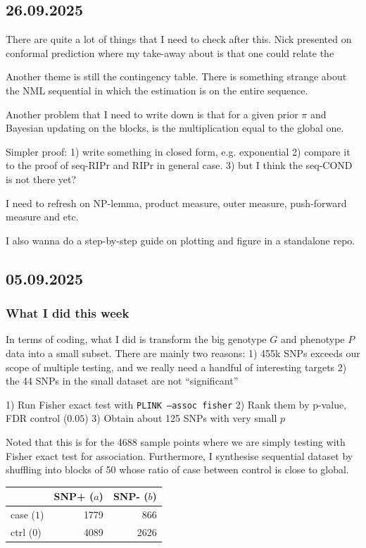 \subsection*{26.09.2025}

There are quite a lot of things that I need to check after this.
Nick presented on conformal prediction where my take-away about is that
one could relate the

Another theme is still the contingency table.
There is something strange about the NML sequential
in which the estimation is on the entire sequence.

Another problem that I need to write down is that for a given prior $\pi$
and Bayesian updating on the blocks, is the multiplication equal to the
global one.

Simpler proof:
1) write something in closed form, e.g. exponential
2) compare it to the proof of seq-RIPr and RIPr in general case.
3) but I think the seq-COND is not there yet?

I need to refresh on NP-lemma, product measure, outer measure, push-forward measure
and etc.

I also wanna do a step-by-step guide on plotting and figure in a standalone repo.

\subsection*{05.09.2025}

\subsubsection*{What I did this week}

In terms of coding, what I did is transform the big genotype $G$ and phenotype $P$ data
into a small subset. There are mainly two reasons:
1) 455k SNPs exceeds our scope of multiple testing, and we really need a handful
of interesting targets
2) the 44 SNPs in the small dataset are not ``significant''

1) Run Fisher exact test with \texttt{PLINK --assoc fisher}
2) Rank them by p-value, FDR control ($0.05$)
3) Obtain about 125 SNPs with very small $p$

Noted that this is for the 4688 sample points where we are simply testing
with Fisher exact test for association.
Furthermore, I synthesise sequential dataset by shuffling into blocks
of 50 whose ratio of case between control is close to global.

\begin{table}[h]
	\centering
	\begin{tabular}{lrr}
		\toprule
		           & SNP+ ($a$) & SNP- ($b$) \\
		\midrule
		case ($1$) & 1779       & 866        \\
		ctrl ($0$) & 4089       & 2626       \\
		\bottomrule
	\end{tabular}
\end{table}

